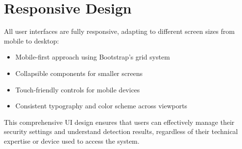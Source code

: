\section{Responsive Design}

All user interfaces are fully responsive, adapting to different screen sizes from mobile to desktop:

\begin{itemize}
    \item Mobile-first approach using Bootstrap's grid system
    \item Collapsible components for smaller screens
    \item Touch-friendly controls for mobile devices
    \item Consistent typography and color scheme across viewports
\end{itemize}

This comprehensive UI design ensures that users can effectively manage their security settings and understand detection results, regardless of their technical expertise or device used to access the system.

